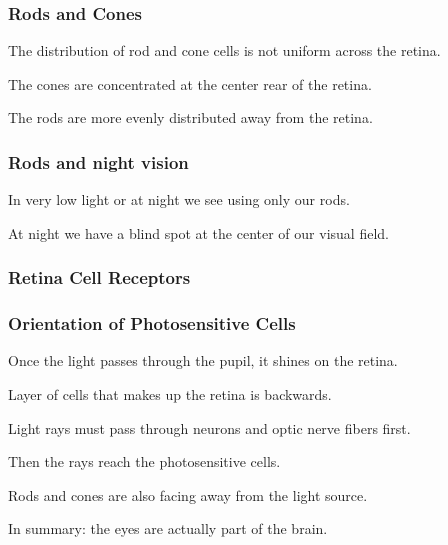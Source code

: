 \documentclass[12pt]{beamer}\usepackage[]{graphicx}\usepackage[]{color}
\begin{document}

\begin{frame}
\frametitle{Rods and Cones}

\bbi
  \item The distribution of rod and cone cells is not uniform across the retina.
  \item The cones are concentrated at the center rear of the retina.
  \item The rods are more evenly distributed away from the retina.
\ei

\end{frame}


\begin{frame}
\frametitle{Rods and night vision}

\bbi
  \item In very low light or at night we see using only our rods.
  \item At night we have a blind spot at the center of our visual field.
\ei

\end{frame}


\begin{frame}
\frametitle{Retina Cell Receptors}
\begin{center}
\end{center}
\end{frame}


\begin{frame}
\frametitle{Orientation of Photosensitive Cells}

\bbi
  \item Once the light passes through the pupil, it shines on the retina.
  \item Layer of cells that makes up the retina is backwards.
  \item Light rays must pass through neurons and optic nerve fibers first.
  \item Then the rays reach the photosensitive cells.
  \item Rods and cones are also facing away from the light source.
  \item In summary: the eyes are actually part of the brain.
\ei

\end{frame}
\end{document}
